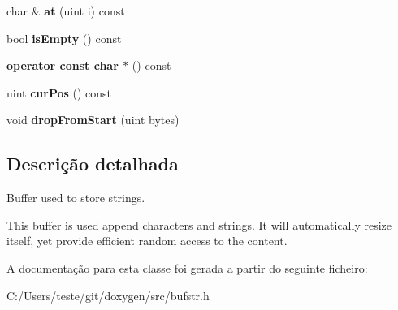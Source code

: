 \begin{DoxyCompactItemize}
\item 
\hypertarget{class_buf_str_a48ffc447358fef79b0fa1673a0713923}{char \& {\bfseries at} (uint i) const }\label{class_buf_str_a48ffc447358fef79b0fa1673a0713923}

\item 
\hypertarget{class_buf_str_a479432127ee77145cc19d6a2d1590821}{bool {\bfseries is\-Empty} () const }\label{class_buf_str_a479432127ee77145cc19d6a2d1590821}

\item 
\hypertarget{class_buf_str_abdd0820f8401e11e09a1e92ab7f4d864}{{\bfseries operator const char $\ast$} () const }\label{class_buf_str_abdd0820f8401e11e09a1e92ab7f4d864}

\item 
\hypertarget{class_buf_str_af948a7e514d827c8717e853bb092aa65}{uint {\bfseries cur\-Pos} () const }\label{class_buf_str_af948a7e514d827c8717e853bb092aa65}

\item 
\hypertarget{class_buf_str_a71685a90c5f48ad42f20f68f27f43894}{void {\bfseries drop\-From\-Start} (uint bytes)}\label{class_buf_str_a71685a90c5f48ad42f20f68f27f43894}

\end{DoxyCompactItemize}


\subsection{Descrição detalhada}
Buffer used to store strings. 

This buffer is used append characters and strings. It will automatically resize itself, yet provide efficient random access to the content. 

A documentação para esta classe foi gerada a partir do seguinte ficheiro\-:\begin{DoxyCompactItemize}
\item 
C\-:/\-Users/teste/git/doxygen/src/bufstr.\-h\end{DoxyCompactItemize}
